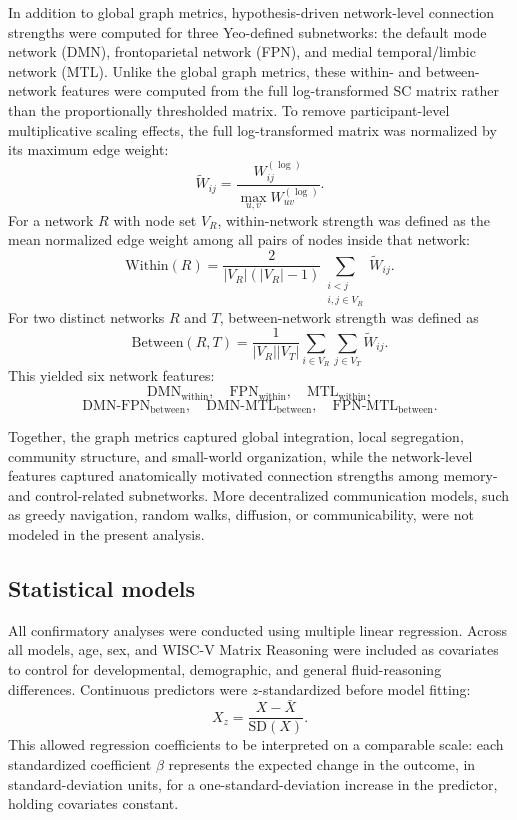 \documentclass[11pt]{article}
\begin{document}
In addition to global graph metrics, hypothesis-driven network-level connection strengths were computed for three Yeo-defined subnetworks: the default mode network (DMN), frontoparietal network (FPN), and medial temporal/limbic network (MTL). Unlike the global graph metrics, these within- and between-network features were computed from the full log-transformed SC matrix rather than the proportionally thresholded matrix. To remove participant-level multiplicative scaling effects, the full log-transformed matrix was normalized by its maximum edge weight:
\[
\widetilde{W}_{ij}
=
\frac{W^{(\log)}_{ij}}
{\max_{u,v} W^{(\log)}_{uv}}.
\]
For a network $R$ with node set $V_R$, within-network strength was defined as the mean normalized edge weight among all pairs of nodes inside that network:
\[
\mathrm{Within}(R)
=
\frac{2}{|V_R|(|V_R|-1)}
\sum_{\substack{i<j\\ i,j\in V_R}}
\widetilde{W}_{ij}.
\]
For two distinct networks $R$ and $T$, between-network strength was defined as
\[
\mathrm{Between}(R,T)
=
\frac{1}{|V_R||V_T|}
\sum_{i\in V_R}
\sum_{j\in V_T}
\widetilde{W}_{ij}.
\]
This yielded six network features:
\[
\mathrm{DMN}_{\mathrm{within}},\quad
\mathrm{FPN}_{\mathrm{within}},\quad
\mathrm{MTL}_{\mathrm{within}},
\]
\[
\mathrm{DMN}\text{-}\mathrm{FPN}_{\mathrm{between}},\quad
\mathrm{DMN}\text{-}\mathrm{MTL}_{\mathrm{between}},\quad
\mathrm{FPN}\text{-}\mathrm{MTL}_{\mathrm{between}}.
\]

Together, the graph metrics captured global integration, local segregation, community structure, and small-world organization, while the network-level features captured anatomically motivated connection strengths among memory- and control-related subnetworks. More decentralized communication models, such as greedy navigation, random walks, diffusion, or communicability, were not modeled in the present analysis.


\subsection{Statistical models}

All confirmatory analyses were conducted using multiple linear regression. Across all models, age, sex, and WISC-V Matrix Reasoning were included as covariates to control for developmental, demographic, and general fluid-reasoning differences. Continuous predictors were $z$-standardized before model fitting:
\[
X_z
=
\frac{X-\bar{X}}{\mathrm{SD}(X)}.
\]
This allowed regression coefficients to be interpreted on a comparable scale: each standardized coefficient $\beta$ represents the expected change in the outcome, in standard-deviation units, for a one-standard-deviation increase in the predictor, holding covariates constant.
\end{document}
